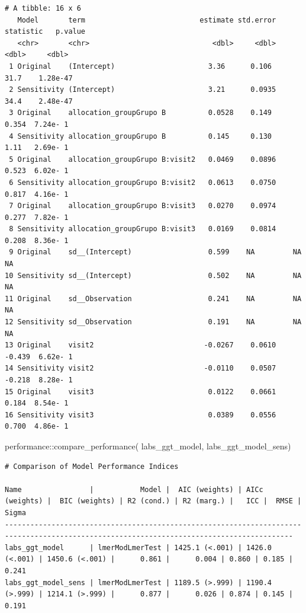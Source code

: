 \documentclass[
  12pt,
]{article}
\newenvironment{Shaded}{\begin{snugshade}}{\end{snugshade}}
\newcommand{\FunctionTok}[1]{\textcolor[rgb]{0.28,0.35,0.67}{#1}}
\newcommand{\NormalTok}[1]{\textcolor[rgb]{0.00,0.23,0.31}{#1}}
\newcommand{\SpecialCharTok}[1]{\textcolor[rgb]{0.37,0.37,0.37}{#1}}
\begin{document}
\begin{verbatim}
# A tibble: 16 x 6
   Model       term                           estimate std.error statistic   p.value
   <chr>       <chr>                             <dbl>     <dbl>     <dbl>     <dbl>
 1 Original    (Intercept)                      3.36      0.106     31.7    1.28e-47
 2 Sensitivity (Intercept)                      3.21      0.0935    34.4    2.48e-47
 3 Original    allocation_groupGrupo B          0.0528    0.149      0.354  7.24e- 1
 4 Sensitivity allocation_groupGrupo B          0.145     0.130      1.11   2.69e- 1
 5 Original    allocation_groupGrupo B:visit2   0.0469    0.0896     0.523  6.02e- 1
 6 Sensitivity allocation_groupGrupo B:visit2   0.0613    0.0750     0.817  4.16e- 1
 7 Original    allocation_groupGrupo B:visit3   0.0270    0.0974     0.277  7.82e- 1
 8 Sensitivity allocation_groupGrupo B:visit3   0.0169    0.0814     0.208  8.36e- 1
 9 Original    sd__(Intercept)                  0.599    NA         NA     NA       
10 Sensitivity sd__(Intercept)                  0.502    NA         NA     NA       
11 Original    sd__Observation                  0.241    NA         NA     NA       
12 Sensitivity sd__Observation                  0.191    NA         NA     NA       
13 Original    visit2                          -0.0267    0.0610    -0.439  6.62e- 1
14 Sensitivity visit2                          -0.0110    0.0507    -0.218  8.28e- 1
15 Original    visit3                           0.0122    0.0661     0.184  8.54e- 1
16 Sensitivity visit3                           0.0389    0.0556     0.700  4.86e- 1
\end{verbatim}

\begin{Shaded}
\begin{Highlighting}[]
\NormalTok{performance}\SpecialCharTok{::}\FunctionTok{compare\_performance}\NormalTok{(}
\NormalTok{    labs\_ggt\_model, }
\NormalTok{    labs\_ggt\_model\_sens)}
\end{Highlighting}
\end{Shaded}

\begin{verbatim}
# Comparison of Model Performance Indices

Name                |           Model |  AIC (weights) | AICc (weights) |  BIC (weights) | R2 (cond.) | R2 (marg.) |   ICC |  RMSE | Sigma
------------------------------------------------------------------------------------------------------------------------------------------
labs_ggt_model      | lmerModLmerTest | 1425.1 (<.001) | 1426.0 (<.001) | 1450.6 (<.001) |      0.861 |      0.004 | 0.860 | 0.185 | 0.241
labs_ggt_model_sens | lmerModLmerTest | 1189.5 (>.999) | 1190.4 (>.999) | 1214.1 (>.999) |      0.877 |      0.026 | 0.874 | 0.145 | 0.191
\end{verbatim}
\end{document}
